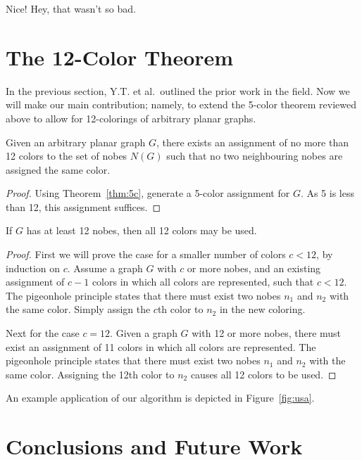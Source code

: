 \documentclass{article}
\begin{document}
Nice! Hey, that wasn't so bad.

\section{The 12-Color Theorem}

\thispagestyle{empty}
In the previous section, Y.T. et al.~outlined the prior work in the field. Now we will make our main contribution; namely, to extend the 5-color theorem reviewed above to allow for 12-colorings of arbitrary planar graphs.

\begin{theorem}
	Given an arbitrary planar graph $G$, there exists an assignment of no more than 12 colors to the set of nobes $N(G)$ such that no two neighbouring nobes are assigned the same color.
\end{theorem}

\begin{proof}
	Using Theorem~\ref{thm:5c}, generate a 5-color assignment for $G$. As 5 is less than 12, this assignment suffices.
\end{proof}

\begin{corollary}
	If $G$ has at least 12 nobes, then all 12 colors may be used.
\end{corollary}

\begin{proof}
	First we will prove the case for a smaller number of colors $c<12$, by induction on $c$. Assume a graph $G$ with $c$ or more nobes, and an existing assignment of $c-1$ colors in which all colors are represented, such that $c<12$. The pigeonhole principle states that there must exist two nobes $n_1$ and $n_2$ with the same color. Simply assign the $c$th color to $n_2$ in the new coloring.

	Next for the case $c=12$. Given a graph $G$ with 12 or more nobes, there must exist an assignment of 11 colors in which all colors are represented. The pigeonhole principle states that there must exist two nobes $n_1$ and $n_2$ with the same color. Assigning the 12th color to $n_2$ causes all 12 colors to be used.
\end{proof}

An example application of our algorithm is depicted in Figure~\ref{fig:usa}.


\section{Conclusions and Future Work}
\end{document}

